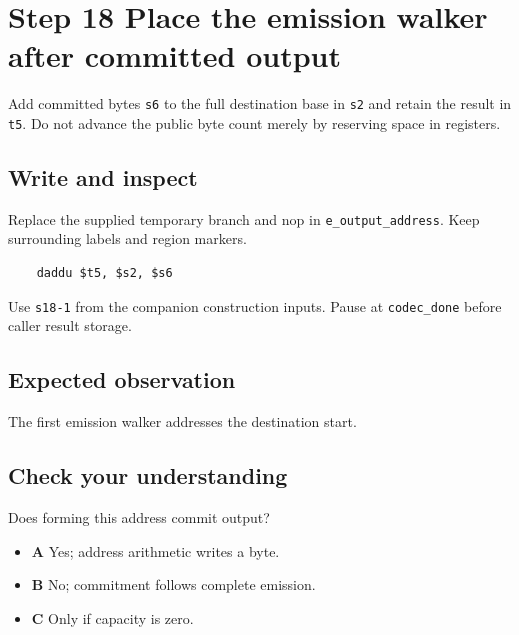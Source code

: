 \section{Step 18 Place the emission walker after committed output}\label{delta-s18}

Add committed bytes \texttt{s6} to the full destination base in \texttt{s2} and retain the result in \texttt{t5}. Do not advance the public byte count merely by reserving space in registers.

\subsection{Write and inspect}
Replace the supplied temporary branch and nop in \texttt{e\_output\_address}. Keep surrounding labels and region markers.

\begin{verbatim}
    daddu $t5, $s2, $s6
\end{verbatim}
Use \texttt{s18-1} from the companion construction inputs. Pause at \texttt{codec\_done} before caller result storage.

\subsection{Expected observation}
The first emission walker addresses the destination start.

\subsection{Check your understanding}
Does forming this address commit output?

\begin{itemize}
  \item \textbf{A} Yes; address arithmetic writes a byte.
  \item \textbf{B} No; commitment follows complete emission.
  \item \textbf{C} Only if capacity is zero.
\end{itemize}
